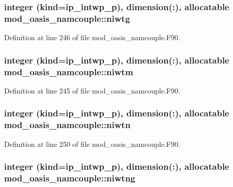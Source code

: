 \hypertarget{classmod__oasis__namcouple_a28e887d61cc4b10c00c33a7d0f51a275}{
\subsubsection[{niwtg}]{\setlength{\rightskip}{0pt plus 5cm}integer (kind=ip\+\_\+intwp\+\_\+p), dimension(\+:), allocatable mod\+\_\+oasis\+\_\+namcouple\+::niwtg\hspace{0.3cm}{\ttfamily [private]}}}\label{classmod__oasis__namcouple_a28e887d61cc4b10c00c33a7d0f51a275}


Definition at line 246 of file mod\+\_\+oasis\+\_\+namcouple.\+F90.

\hypertarget{classmod__oasis__namcouple_a90e4ce86f77bf89c71a9277ff9b5dcbb}{
\subsubsection[{niwtm}]{\setlength{\rightskip}{0pt plus 5cm}integer (kind=ip\+\_\+intwp\+\_\+p), dimension(\+:), allocatable mod\+\_\+oasis\+\_\+namcouple\+::niwtm\hspace{0.3cm}{\ttfamily [private]}}}\label{classmod__oasis__namcouple_a90e4ce86f77bf89c71a9277ff9b5dcbb}


Definition at line 245 of file mod\+\_\+oasis\+\_\+namcouple.\+F90.

\hypertarget{classmod__oasis__namcouple_a63c2f2977f9cc4839f6bdec7bbbc5fa7}{
\subsubsection[{niwtn}]{\setlength{\rightskip}{0pt plus 5cm}integer (kind=ip\+\_\+intwp\+\_\+p), dimension(\+:), allocatable mod\+\_\+oasis\+\_\+namcouple\+::niwtn\hspace{0.3cm}{\ttfamily [private]}}}\label{classmod__oasis__namcouple_a63c2f2977f9cc4839f6bdec7bbbc5fa7}


Definition at line 250 of file mod\+\_\+oasis\+\_\+namcouple.\+F90.

\hypertarget{classmod__oasis__namcouple_a3379333e7d0f24b776c81b1087f3a3b4}{
\subsubsection[{niwtng}]{\setlength{\rightskip}{0pt plus 5cm}integer (kind=ip\+\_\+intwp\+\_\+p), dimension(\+:), allocatable mod\+\_\+oasis\+\_\+namcouple\+::niwtng\hspace{0.3cm}{\ttfamily [private]}}}\label{classmod__oasis__namcouple_a3379333e7d0f24b776c81b1087f3a3b4}


